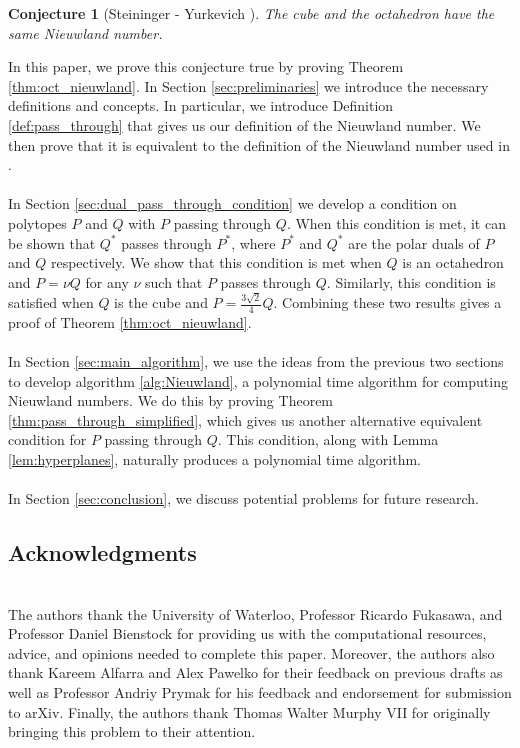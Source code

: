 \documentclass[a4paper]{amsart}
\newtheorem{conj}[thm]{Conjecture}
\theoremstyle{remark}
\begin{document}
\begin{conj}[Steininger - Yurkevich \cite{StYu23}] \label{conj:cube_octo}
	The cube and the octahedron have the same Nieuwland number.
\end{conj}
\noindent
In this paper, we prove this conjecture true by proving Theorem \ref{thm:oct_nieuwland}. In Section \ref{sec:preliminaries} we introduce the necessary definitions and concepts. In particular, we introduce Definition \ref{def:pass_through} that gives us our definition of the Nieuwland number. We then prove that it is equivalent to the definition of the Nieuwland number used in \cite{StYu23}. 
\\\\
In Section \ref{sec:dual_pass_through_condition} we develop a condition on polytopes $P$ and $Q$ with $P$ passing through $Q$. When this condition is met, it can be shown that $Q^*$ passes through $P^*$, where $P^*$ and $Q^*$ are the polar duals of $P$ and $Q$ respectively. We show that this condition is met when $Q$ is an octahedron and $P=\nu Q$ for any $\nu$ such that $P$ passes through $Q$. Similarly, this condition is satisfied when $Q$ is the cube and $P=\frac{3\sqrt2}{4}Q$. Combining these two results gives a proof of Theorem \ref{thm:oct_nieuwland}. 
\\\\
In Section \ref{sec:main_algorithm}, we use the ideas from the previous two sections to develop algorithm \ref{alg:Nieuwland}, a polynomial time algorithm for computing Nieuwland numbers. We do this by proving Theorem \ref{thm:pass_through_simplified}, which gives us another alternative equivalent condition for $P$ passing through $Q$. This condition, along with Lemma \ref{lem:hyperplanes}, naturally produces a polynomial time algorithm.\\\\
In Section \ref{sec:conclusion}, we discuss potential problems for future research.
\\
\subsection{Acknowledgments}
\hfill \\
The authors thank the University of Waterloo, Professor Ricardo Fukasawa, and Professor Daniel Bienstock for providing us with the computational resources, advice, and opinions needed to complete this paper. Moreover, the authors also thank Kareem Alfarra and Alex Pawelko for their feedback on previous drafts as well as Professor Andriy Prymak for his feedback and endorsement for submission to arXiv. Finally, the authors thank Thomas Walter Murphy VII for originally bringing this problem to their attention.
\end{document}

